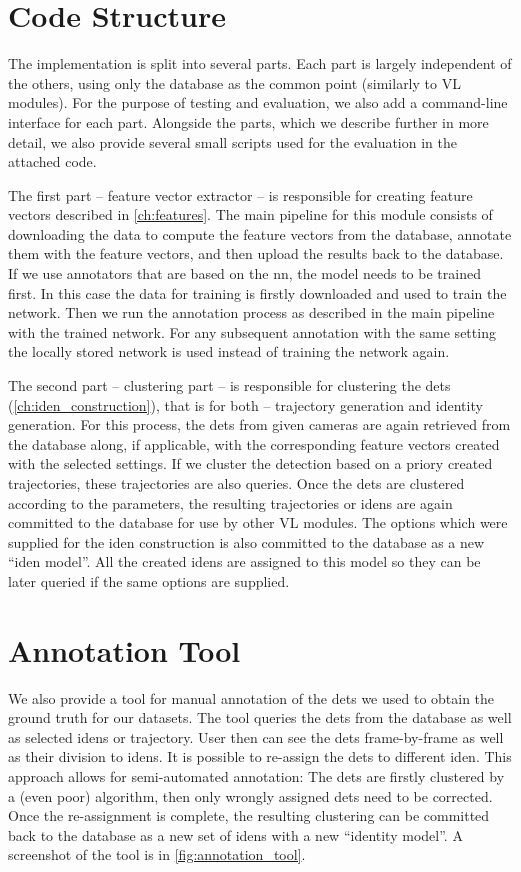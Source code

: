 \section{Code Structure}
The implementation is split into several parts. Each part is largely independent of the others, using only the database as the common point (similarly to \gls{VL} modules). For the purpose of testing and evaluation, we also add a command-line interface for each part.  Alongside the parts, which we describe further in more detail, we also provide several small scripts used for the evaluation in the attached code.

The first part -- feature vector extractor -- is responsible for creating feature vectors described in \autoref{ch:features}. The main pipeline for this module consists of downloading the data to compute the feature vectors from the database, annotate them with the feature vectors, and then upload the results back to the database. If we use annotators that are based on the \gls{nn}, the model needs to be trained first. In this case the data for training is firstly downloaded and used to train the network. Then we run the annotation process as described in the main pipeline with the trained network. For any subsequent annotation with the same setting the locally stored network is used instead of training the network again.

The second part -- clustering part -- is responsible for clustering the \glspl{det} (\autoref{ch:iden_construction}), that is for both -- trajectory generation and identity generation. For this process, the \glspl{det} from given cameras are again retrieved from the database along, if applicable, with the corresponding feature vectors created with the selected settings. If we cluster the detection based on a priory created trajectories, these trajectories are also queries. Once the \glspl{det} are clustered according to the parameters, the resulting trajectories or \glspl{iden} are again committed to the database for use by other \gls{VL} modules. The options which were supplied for the \gls{iden} construction is also committed to the database as a new ``\gls{iden} model''. All the created \glspl{iden} are assigned to this model so they can be later queried if the same options are supplied.


\section{Annotation Tool}
We also provide a tool for manual annotation of the \glspl{det} we used to obtain the ground truth for our datasets. The tool queries the \glspl{det} from the database as well as selected \glspl{iden} or trajectory. User then can see the \glspl{det} frame-by-frame as well as their division to \glspl{iden}. It is possible to re-assign the \glspl{det} to different \gls{iden}. This approach allows for semi-automated annotation: The \glspl{det} are firstly clustered by a (even poor) algorithm, then only wrongly assigned \glspl{det} need to be corrected. Once the re-assignment is complete, the resulting clustering can be committed back to the database as a new set of \glspl{iden} with a new ``identity model''. A screenshot of the tool is in \autoref{fig:annotation_tool}.

